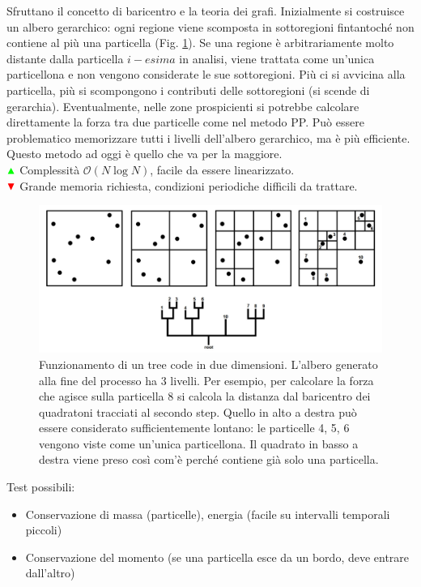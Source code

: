 \begin{example}
   Sfruttano il concetto di baricentro e la teoria dei grafi. Inizialmente si costruisce un albero gerarchico: ogni regione viene scomposta in sottoregioni fintantoché non contiene al più una particella (Fig. \ref{fig9:treecode}). Se una regione è arbitrariamente molto distante dalla particella $i-esima$ in analisi, viene trattata come un'unica particellona e non vengono considerate le sue sottoregioni. Più ci si avvicina alla particella, più si scompongono i contributi delle sottoregioni (si scende di gerarchia). Eventualmente, nelle zone prospicienti si potrebbe calcolare direttamente la forza tra due particelle come nel metodo PP. Può essere problematico memorizzare tutti i livelli dell'albero gerarchico, ma è più efficiente. Questo metodo ad oggi è quello che va per la maggiore.
   \\ ${\color{green} \blacktriangle  }$ Complessità $\mathcal{O} (N\log N)$, facile da essere linearizzato.
\\ ${\color{red} \blacktriangledown } $ Grande memoria richiesta, condizioni periodiche difficili da trattare.
   \begin{figure}[H]
    \centering
    \includegraphics[width=.95 \textwidth]{Pictures/9/treecode.jpg}
    \caption{Funzionamento di un tree code in due dimensioni. L'albero generato alla fine del processo ha 3 livelli. Per esempio, per calcolare la forza che agisce sulla particella 8 si calcola la distanza dal baricentro dei quadratoni tracciati al secondo step. Quello in alto a destra può essere considerato sufficientemente lontano: le particelle 4, 5, 6 vengono viste come un'unica particellona. Il quadrato in basso a destra viene preso così com'è perché contiene già solo una particella. }\label{fig9:treecode}
\end{figure}
\end{example}  

\noindent Test possibili:
\begin{itemize}
    \item Conservazione di massa (particelle), energia (facile su intervalli temporali piccoli)
    \item Conservazione del momento (se una particella esce da un bordo, deve entrare dall'altro)
\end{itemize}

